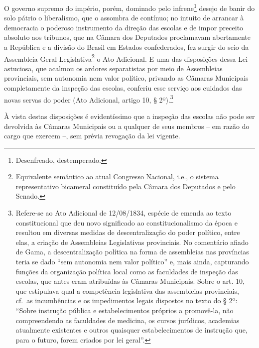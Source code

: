 O governo supremo do império, porém, dominado pelo infrene\footnote{
  Desenfreado, destemperado.} desejo de banir do solo pátrio o
liberalismo, que o assombra de contínuo; no intuito de arrancar à
democracia o poderoso instrumento da direção das escolas e de impor
preceito absoluto aos tribunos, que na Câmara dos Deputados proclamavam
abertamente a República e a divisão do Brasil em Estados confederados,
fez surgir do seio da Assembleia Geral Legislativa\footnote{
  Equivalente semântico ao atual Congresso Nacional, i.e., o sistema
  representativo bicameral constituído pela Câmara dos Deputados e pelo
  Senado.} o Ato Adicional. E uma das disposições dessa Lei astuciosa,
que acalmou os ardores separatistas por meio de Assembleias provinciais,
sem autonomia nem valor político, privando as Câmaras Municipais
completamente da inspeção das escolas, conferiu esse serviço aos
cuidados das novas servas do poder (Ato Adicional, artigo 10, §
2º).\footnote{Refere-se ao Ato Adicional de 12/08/1834, espécie de
  emenda ao texto constitucional que deu novo significado ao
  constitucionalismo da época e resultou em diversas medidas de
  descentralização do poder político, entre elas, a criação de
  Assembleias Legislativas provinciais. No comentário afiado de Gama, a
  descentralização política na forma de assembleias nas províncias teria
  se dado ``sem autonomia nem valor político'' e, mais ainda, capturando
  funções da organização política local como as faculdades de inspeção
  das escolas, que antes eram atribuídas às Câmaras Municipais. Sobre o
  art. 10, que estipulava qual a competência legislativa das assembleias
  provinciais, cf.~as incumbências e os impedimentos legais dispostos no
  texto do § 2º: ``Sobre instrução pública e estabelecimentos próprios a
  promovê-la, não compreendendo as faculdades de medicina, os cursos
  jurídicos, academias atualmente existentes e outros quaisquer
  estabelecimentos de instrução que, para o futuro, forem criados por
  lei geral''.}

À vista destas disposições é evidentíssimo que a inspeção das escolas
não pode ser devolvida às Câmaras Municipais ou a qualquer de seus
membros -- em razão do cargo que exercem --, sem prévia revogação da lei
vigente.

